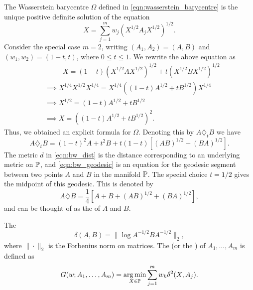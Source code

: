 \documentclass[11pt,a4paper]{article}
\begin{document}
\begin{remark}
    The Wasserstein barycentre $\Omega$ defined in \eqref{eqn:wasserstein_barycentre} is the unique positive definite solution of the equation 
    \begin{equation}
        X = \sum_{j=1}^m w_j(X^{1/2}A_jX^{1/2})^{1/2}.
    \end{equation}
    Consider the special case $m = 2$, writing $(A_1,A_2) = (A,B)$ and $(w_1,w_2) = (1-t, t)$, where $0\le t\le 1$. We rewrite the above equation as
    \begin{align*}
        &\qquad\ \ \, X = (1-t) (X^{1/2}AX^{1/2})^{1/2} + t (X^{1/2}BX^{1/2})^{1/2} \\
        &\implies X^{1/4} X^{1/2} X^{1/4} = X^{1/4} ((1-t)A^{1/2}+tB^{1/2}) X^{1/4}\\
        &\implies X^{1/2} = (1-t)A^{1/2}+tB^{1/2}\\
        &\implies X = ((1-t)A^{1/2}+tB^{1/2})^2.
    \end{align*}
    Thus, we obtained an explicit formula for $\Omega$. Denoting this by $A\diamondsuit_t B$ we have
    \begin{equation}\label{eqn:bw_geodesic}
        A\diamondsuit_t B = (1-t)^2 A + t^2 B + t(1-t)[(AB)^{1/2}+(BA)^{1/2}].
    \end{equation}
    The metric $d$ in \eqref{eqn:bw_dist} is the distance corresponding to an underlying metric on $\mathbb{P}$, and \eqref{eqn:bw_geodesic} is an equation for the geodesic segment between two points $A$ and $B$ in the manifold $\mathbb{P}$. The special choice $t=1/2$ gives the midpoint of this geodesic. This is denoted by 
    \begin{equation}\label{eqn:wasserstein_mean_midpoint}
        A\diamondsuit B = \dfrac{1}{4} [A+B+(AB)^{1/2}+(BA)^{1/2}],
    \end{equation}
    and can be thought of as the  of $A$ and $B$.
\end{remark}

\begin{definition}
    The  
    \begin{equation}\label{eqn:cartan_metric}
        \delta(A,B) = \|\log A^{-1/2}BA^{-1/2}\|_2,
    \end{equation}
    where $\|\cdot\|_2$ is the Forbenius norm on matrices. The  (or the  ) of $A_1,\ldots, A_m$ is defined as
    \begin{equation}\label{eqn:cartan_mean}
        G(w;A_1,\ldots,A_m) = \underset{X\in\mathbb{P}}{\arg\min} \sum_{j=1}^m w_k\delta^2(X,A_j).
    \end{equation}
\end{definition}
\end{document}
